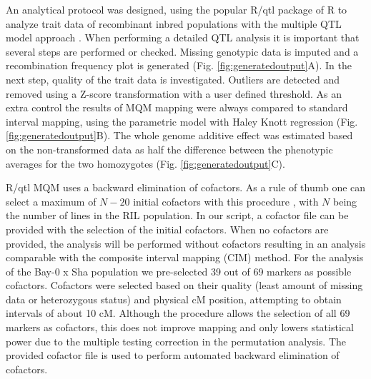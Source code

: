 An analytical protocol was designed, using the popular R/qtl package of R to analyze trait data of 
recombinant inbred populations with the multiple QTL model approach \cite{Arends:2010}. When 
performing a detailed QTL analysis it is important that several steps are performed or checked. 
Missing genotypic data is imputed and a recombination frequency plot is generated (Fig. \ref{fig:generatedoutput}A). In 
the next step, quality of the trait data is investigated. Outliers are detected and removed using 
a Z-score transformation with a user defined threshold. As an extra control the results of MQM mapping 
were always compared to standard interval mapping, using the parametric model with Haley Knott 
regression \cite{Haley:1992} (Fig. \ref{fig:generatedoutput}B). The whole genome additive effect was estimated based 
on the non-transformed data as half the difference between the phenotypic averages for the two 
homozygotes (Fig. \ref{fig:generatedoutput}C).

R/qtl MQM uses a backward elimination of cofactors. As a rule of thumb one can select a maximum of 
$N-20$ initial cofactors with this procedure \cite{Handbook:Jansen:2007}, with $N$ being the number of lines in 
the RIL population. In our script, a cofactor file can be provided with the selection of the initial 
cofactors. When no cofactors are provided, the analysis will be performed without cofactors resulting 
in an analysis comparable with the composite interval mapping (CIM) method. For the analysis of the 
Bay-0 x Sha population we pre-selected 39 out of 69 markers as possible cofactors. Cofactors were selected 
based on their quality (least amount of missing data or heterozygous status) and physical cM position, 
attempting to obtain intervals of about 10 cM. Although the procedure allows the selection of all 69 
markers as cofactors, this does not improve mapping and only lowers statistical power due to the 
multiple testing correction in the permutation analysis. The provided cofactor file is used to perform 
automated backward elimination of cofactors.

